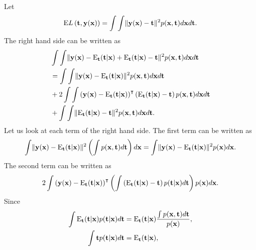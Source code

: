\subsection{}
\label{1.26}
Let
%
\begin{equation}
{\rm E} L\left( \mathbf{t}, \mathbf{y} (\mathbf{x}) \right) = \int \int \lVert \mathbf{y}(\mathbf{x}) - \mathbf{t} \rVert ^ 2 p(\mathbf{x}, \mathbf{t}) d\mathbf{x} d\mathbf{t}.
\end{equation}
%
The right hand side can be written as
%
\begin{equation}
\begin{aligned}
&\int \int \lVert \mathbf{y}(\mathbf{x}) - {\rm E}_\mathbf{t} (\mathbf{t} | \mathbf{x}) + {\rm E}_\mathbf{t} (\mathbf{t} | \mathbf{x}) - \mathbf{t} \rVert ^ 2 p(\mathbf{x}, \mathbf{t}) d\mathbf{x} d\mathbf{t} \\ 
&= \int \int \lVert \mathbf{y}(\mathbf{x}) - {\rm E}_\mathbf{t} (\mathbf{t} | \mathbf{x}) \rVert ^ 2 p(\mathbf{x}, \mathbf{t}) d\mathbf{x} d\mathbf{t} \\
&+ 2 \int \int \left( \mathbf{y}(\mathbf{x}) - {\rm E}_\mathbf{t} (\mathbf{t} | \mathbf{x}) \right) ^ \intercal \left( {\rm E}_\mathbf{t} (\mathbf{t} | \mathbf{x}) - \mathbf{t} \right) p(\mathbf{x}, \mathbf{t}) d\mathbf{x} d\mathbf{t} \\
&+ \int \int \lVert {\rm E}_\mathbf{t} (\mathbf{t} | \mathbf{x}) - \mathbf{t} \rVert ^ 2 p(\mathbf{x}, \mathbf{t}) d\mathbf{x} d\mathbf{t}.
\end{aligned}
\end{equation}
%
Let us look at each term of the right hand side.
The first term can be written as
%
\begin{equation}
\int \lVert \mathbf{y}(\mathbf{x}) - {\rm E}_\mathbf{t} (\mathbf{t} | \mathbf{x}) \rVert ^ 2 \left( \int p(\mathbf{x}, \mathbf{t}) d\mathbf{t} \right) d\mathbf{x} = \int \lVert \mathbf{y}(\mathbf{x}) - {\rm E}_\mathbf{t} (\mathbf{t} | \mathbf{x}) \rVert ^ 2 p(\mathbf{x}) d\mathbf{x}.
\end{equation}
%
The second term can be written as
%
\begin{equation}
2 \int \left( \mathbf{y}(\mathbf{x}) - {\rm E}_\mathbf{t} (\mathbf{t} | \mathbf{x}) \right) ^ \intercal \left( \int \left( {\rm E}_\mathbf{t} (\mathbf{t} | \mathbf{x}) - \mathbf{t} \right) p(\mathbf{t} | \mathbf{x}) d\mathbf{t} \right) p(\mathbf{x}) d\mathbf{x}.
\end{equation}
%
Since
%
\begin{equation}
\begin{aligned}
\int {\rm E}_\mathbf{t} (\mathbf{t} | \mathbf{x}) p(\mathbf{t} | \mathbf{x}) d\mathbf{t} &= {\rm E}_\mathbf{t} (\mathbf{t} | \mathbf{x}) \frac{\int p(\mathbf{x}, \mathbf{t}) d\mathbf{t}}{p(\mathbf{x})}, \\
\int \mathbf{t} p(\mathbf{t} | \mathbf{x}) d\mathbf{t} &= {\rm E}_\mathbf{t} (\mathbf{t} | \mathbf{x}),
\end{aligned}
\end{equation}
